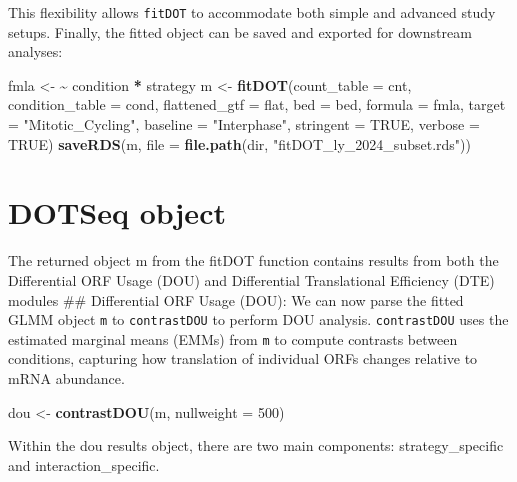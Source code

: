 \documentclass[
]{article}
\newenvironment{Shaded}{\begin{snugshade}}{\end{snugshade}}
\newcommand{\AttributeTok}[1]{\textcolor[rgb]{0.13,0.29,0.53}{#1}}
\newcommand{\ConstantTok}[1]{\textcolor[rgb]{0.56,0.35,0.01}{#1}}
\newcommand{\DecValTok}[1]{\textcolor[rgb]{0.00,0.00,0.81}{#1}}
\newcommand{\ErrorTok}[1]{\textcolor[rgb]{0.64,0.00,0.00}{\textbf{#1}}}
\newcommand{\FunctionTok}[1]{\textcolor[rgb]{0.13,0.29,0.53}{\textbf{#1}}}
\newcommand{\NormalTok}[1]{#1}
\newcommand{\OtherTok}[1]{\textcolor[rgb]{0.56,0.35,0.01}{#1}}
\newcommand{\SpecialCharTok}[1]{\textcolor[rgb]{0.81,0.36,0.00}{\textbf{#1}}}
\newcommand{\StringTok}[1]{\textcolor[rgb]{0.31,0.60,0.02}{#1}}
\begin{document}
This flexibility allows \texttt{fitDOT} to accommodate both simple and
advanced study setups. Finally, the fitted object can be saved and
exported for downstream analyses:

\begin{Shaded}
\begin{Highlighting}[]
\NormalTok{fmla }\OtherTok{\textless{}{-}} \ErrorTok{\textasciitilde{}}\NormalTok{ condition }\SpecialCharTok{*}\NormalTok{ strategy}
\NormalTok{m }\OtherTok{\textless{}{-}} \FunctionTok{fitDOT}\NormalTok{(}\AttributeTok{count\_table =}\NormalTok{ cnt, }\AttributeTok{condition\_table =}\NormalTok{ cond, }\AttributeTok{flattened\_gtf =}\NormalTok{ flat, }\AttributeTok{bed =}\NormalTok{ bed, }\AttributeTok{formula =}\NormalTok{ fmla,}
            \AttributeTok{target =} \StringTok{"Mitotic\_Cycling"}\NormalTok{, }\AttributeTok{baseline =} \StringTok{"Interphase"}\NormalTok{, }\AttributeTok{stringent =} \ConstantTok{TRUE}\NormalTok{, }\AttributeTok{verbose =} \ConstantTok{TRUE}\NormalTok{)}
\FunctionTok{saveRDS}\NormalTok{(m, }\AttributeTok{file =} \FunctionTok{file.path}\NormalTok{(dir, }\StringTok{"fitDOT\_ly\_2024\_subset.rds"}\NormalTok{))}
\end{Highlighting}
\end{Shaded}

\section{DOTSeq object}\label{dotseq-object}

The returned object m from the fitDOT function contains results from
both the Differential ORF Usage (DOU) and Differential Translational
Efficiency (DTE) modules \#\# Differential ORF Usage (DOU): We can now
parse the fitted GLMM object \texttt{m} to \texttt{contrastDOU} to
perform DOU analysis. \texttt{contrastDOU} uses the estimated marginal
means (EMMs) from \texttt{m} to compute contrasts between conditions,
capturing how translation of individual ORFs changes relative to mRNA
abundance.

\begin{Shaded}
\begin{Highlighting}[]
\NormalTok{dou }\OtherTok{\textless{}{-}} \FunctionTok{contrastDOU}\NormalTok{(m, }\AttributeTok{nullweight =} \DecValTok{500}\NormalTok{)}
\end{Highlighting}
\end{Shaded}

Within the dou results object, there are two main components:
strategy\_specific and interaction\_specific.
\end{document}
